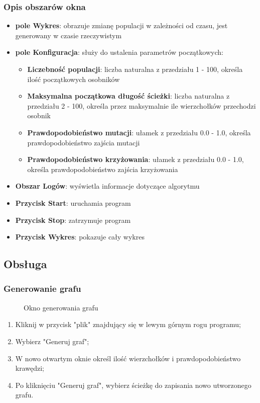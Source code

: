 \documentclass[a4paper,12pt]{article}
\begin{document}
\subsubsection{Opis obszarów okna}
\begin{itemize}
\item \textbf{pole Wykres}: obrazuje zmianę populacji w zależności od czasu, jest generowany w czasie rzeczywistym
\item \textbf{pole Konfiguracja}: służy do ustalenia parametrów początkowych:
\begin{itemize}
\item \textbf{Liczebność populacji}: liczba naturalna z przedziału 1 - 100, określa ilość początkowych osobników
\item \textbf{Maksymalna początkowa długość ścieżki}: liczba naturalna z przedziału 2 - 100, określa przez maksymalnie ile wierzchołków przechodzi osobnik
\item \textbf{Prawdopodobieństwo mutacji}: ułamek z przedziału 0.0 - 1.0, określa prawdopodobieństwo zajścia mutacji
\item \textbf{Prawdopodobieństwo krzyżowania}: ułamek z przedziału 0.0 - 1.0, określa prawdopodobieństwo zajścia krzyżowania
\end{itemize}
\item \textbf{Obszar Logów}: wyświetla informacje dotyczące algorytmu
\item \textbf{Przycisk Start}: uruchamia program
\item \textbf{Przycisk Stop}: zatrzymuje program
\item \textbf{Przycisk Wykres}: pokazuje cały wykres
\end{itemize}
\subsection{Obsługa}
\subsubsection{Generowanie grafu}
\begin{figure}[htbp]
\caption{Okno generowania grafu}
\end{figure}
\begin{enumerate}
\item Kliknij w przycisk "plik" znajdujący się w lewym górnym rogu programu;
\item Wybierz "Generuj graf";
\item W nowo otwartym oknie określ ilość wierzchołków i prawdopodobieństwo krawędzi;
\item Po kliknięciu "Generuj graf", wybierz ścieżkę do zapisania nowo utworzonego grafu.
\end{enumerate}
\newpage
\end{document}
